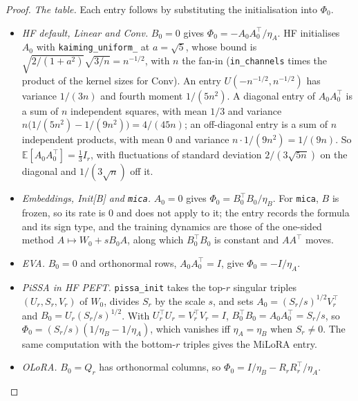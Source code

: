 \begin{proof}
\emph{The table.} Each entry follows by substituting the initialisation into $\Phi_0$.
\begin{itemize}
\item \emph{HF default, Linear and Conv.} $B_0=0$ gives $\Phi_0=-A_0A_0^\top/\eta_A$. HF initialises $A_0$ with
\texttt{kaiming\_uniform\_} at $a=\sqrt5$, whose bound is $\sqrt{2/(1+a^2)}\sqrt{3/n}=n^{-1/2}$, with $n$ the fan-in
(\texttt{in\_channels} times the product of the kernel sizes for Conv). An entry $U(-n^{-1/2},n^{-1/2})$ has variance
$1/(3n)$ and fourth moment $1/(5n^2)$. A diagonal entry of $A_0A_0^\top$ is a sum of $n$ independent squares, with mean
$1/3$ and variance $n\big(1/(5n^2)-1/(9n^2)\big)=4/(45n)$; an off-diagonal entry is a sum of $n$ independent products,
with mean $0$ and variance $n\cdot1/(9n^2)=1/(9n)$. So $\mathbb E[A_0A_0^\top]=\tfrac13I_r$, with fluctuations of standard
deviation $2/(3\sqrt{5n})$ on the diagonal and $1/(3\sqrt n)$ off it.
\item \emph{Embeddings, Init[B] and \texttt{mica}.} $A_0=0$ gives $\Phi_0=B_0^\top B_0/\eta_B$. For \texttt{mica}, $B$ is
frozen, so its rate is $0$ and  does not apply to it; the entry records the formula and its sign
type, and the training dynamics are those of the one-sided method $A\mapsto W_0+sB_0A$, along which $B_0^\top B_0$ is
constant and $AA^\top$ moves.
\item \emph{EVA.} $B_0=0$ and orthonormal rows, $A_0A_0^\top=I$, give $\Phi_0=-I/\eta_A$.
\item \emph{PiSSA in HF PEFT.} \texttt{pissa\_init} takes the top-$r$ singular triples $(U_r,S_r,V_r)$ of $W_0$, divides
$S_r$ by the scale $s$, and sets $A_0=(S_r/s)^{1/2}V_r^\top$ and $B_0=U_r(S_r/s)^{1/2}$. With $U_r^\top U_r=V_r^\top V_r=I$,
$B_0^\top B_0=A_0A_0^\top=S_r/s$, so $\Phi_0=(S_r/s)(1/\eta_B-1/\eta_A)$, which vanishes iff $\eta_A=\eta_B$ when
$S_r\ne0$. The same computation with the bottom-$r$ triples gives the MiLoRA entry.
\item \emph{OLoRA.} $B_0=Q_r$ has orthonormal columns, so $\Phi_0=I/\eta_B-R_rR_r^\top/\eta_A$.
\end{itemize}


\end{proof}
